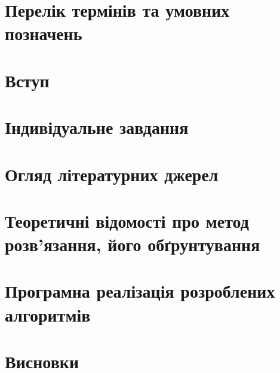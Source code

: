 





\clearpage
\setcounter{page}{2}

\tableofcontents
\thispagestyle{empty}

\clearpage
\pagestyle{fancy}

\chapter*{Перелік термінів та умовних позначень}


\chapter*{Вступ}


\chapter{Індивідуальне завдання}


\chapter{Огляд літературних джерел}


\chapter{Теоретичні відомості про метод розв’язання, його обґрунтування}


\chapter{Програмна реалізація розроблених алгоритмів}


\chapter*{Висновки}






